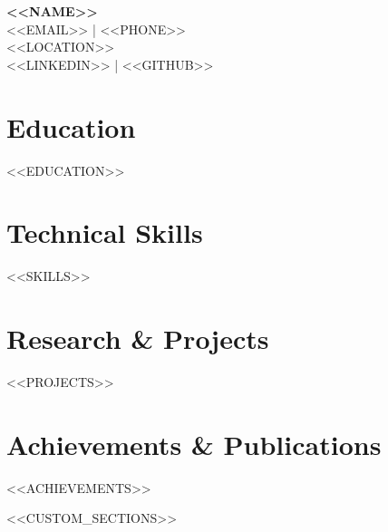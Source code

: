 \documentclass[11pt,a4paper]{article}
\begin{document}
\begin{center}
{\Large\bfseries <<NAME>>}\\[0.3cm]
<<EMAIL>> | <<PHONE>>\\[0.1cm]
<<LOCATION>>\\[0.1cm]
<<LINKEDIN>> | <<GITHUB>>
\end{center}

\vspace{0.5cm}

\section{Education}
<<EDUCATION>>

\section{Technical Skills}
<<SKILLS>>

\section{Research \& Projects}
<<PROJECTS>>

\section{Achievements \& Publications}
\begin{itemize}[leftmargin=*]
<<ACHIEVEMENTS>>
\end{itemize}

<<CUSTOM_SECTIONS>>
\end{document}
